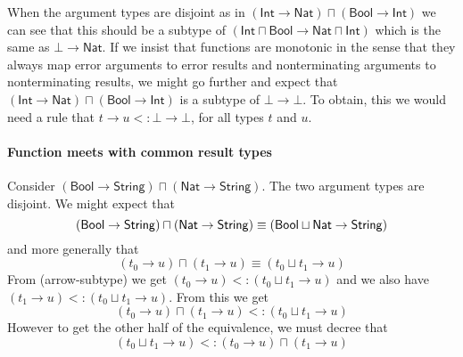 \documentclass[12pt]{article}
\begin{document}
When the argument types are disjoint as in $\left( \mathsf{Int}\rightarrow 
\mathsf{Nat}\right) \sqcap \left( \mathsf{Bool}\rightarrow \mathsf{Int}%
\right) $ we can see that this should be a subtype of $\left( \mathsf{Int}%
\sqcap \mathsf{Bool}\rightarrow \mathsf{Nat}\sqcap \mathsf{Int}\right) $
which is the same as $\mathsf{\bot }\rightarrow \mathsf{Nat}$. If we insist
that functions are monotonic in the sense that they always map error
arguments to error results and nonterminating arguments to nonterminating
results, we might go further and expect that $\left( \mathsf{Int}\rightarrow 
\mathsf{Nat}\right) \sqcap \left( \mathsf{Bool}\rightarrow \mathsf{Int}%
\right) $ is a subtype of $\mathsf{\bot }\rightarrow \mathsf{\bot }$. To
obtain, this we would need a rule that $t\rightarrow u<:\mathsf{\bot }%
\rightarrow \mathsf{\bot }$, for all types $t$ and $u$.

\paragraph{Function meets with common result types}

Consider $\left( \mathsf{Bool}\rightarrow \mathsf{String}\right) \sqcap
\left( \mathsf{Nat}\rightarrow \mathsf{String}\right) $. The two argument
types are disjoint. We might expect that 
\begin{equation*}
\left( \mathsf{Bool}\rightarrow \mathsf{String}\right) \sqcap \left( \mathsf{%
Nat}\rightarrow \mathsf{String}\right) \equiv \left( \mathsf{Bool}\sqcup 
\mathsf{Nat}\rightarrow \mathsf{String}\right)
\end{equation*}%
and more generally that 
\begin{equation*}
\left( t_{0}\rightarrow u\right) \sqcap \left( t_{1}\rightarrow u\right)
\equiv \left( t_{0}\sqcup t_{1}\rightarrow u\right)
\end{equation*}%
From (arrow-subtype) we get $\left( t_{0}\rightarrow u\right) <:\left(
t_{0}\sqcup t_{1}\rightarrow u\right) $ and we also have $\left(
t_{1}\rightarrow u\right) <:\left( t_{0}\sqcup t_{1}\rightarrow u\right) $.
From this we get 
\begin{equation*}
\left( t_{0}\rightarrow u\right) \sqcap \left( t_{1}\rightarrow u\right)
<:\left( t_{0}\sqcup t_{1}\rightarrow u\right)
\end{equation*}%
However to get the other half of the equivalence, we must decree that%
\begin{equation*}
\left( t_{0}\sqcup t_{1}\rightarrow u\right) <:\left( t_{0}\rightarrow
u\right) \sqcap \left( t_{1}\rightarrow u\right)
\end{equation*}
\end{document}
